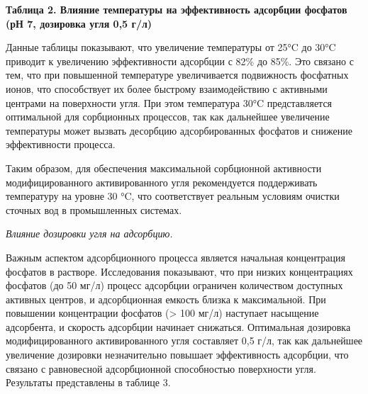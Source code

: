 {\bfseries Таблица 2. Влияние температуры на эффективность адсорбции
фосфатов (рН 7, дозировка угля 0,5 г/л)}


Данные таблицы показывают, что увеличение температуры от 25°C до 30°C
приводит к увеличению эффективности адсорбции с 82\% до 85\%. Это
связано с тем, что при повышенной температуре увеличивается подвижность
фосфатных ионов, что способствует их более быстрому взаимодействию с
активными центрами на поверхности угля. При этом температура 30°C
представляется оптимальной для сорбционных процессов, так как дальнейшее
увеличение температуры может вызвать десорбцию адсорбированных фосфатов
и снижение эффективности процесса.

Таким образом, для обеспечения максимальной сорбционной активности
модифицированного активированного угля рекомендуется поддерживать
температуру на уровне 30 °C, что соответствует реальным условиям очистки
сточных вод в промышленных системах.

\emph{Влияние дозировки угля на адсорбцию.}

Важным аспектом адсорбционного процесса является начальная концентрация
фосфатов в растворе. Исследования показывают, что при низких
концентрациях фосфатов (до 50 мг/л) процесс адсорбции ограничен
количеством доступных активных центров, и адсорбционная емкость близка к
максимальной. При повышении концентрации фосфатов (\textgreater{} 100
мг/л) наступает насыщение адсорбента, и скорость адсорбции начинает
снижаться. Оптимальная дозировка модифицированного активированного угля
составляет 0,5 г/л, так как дальнейшее увеличение дозировки
незначительно повышает эффективность адсорбции, что связано с
равновесной адсорбционной способностью поверхности угля. Результаты
представлены в таблице 3.

